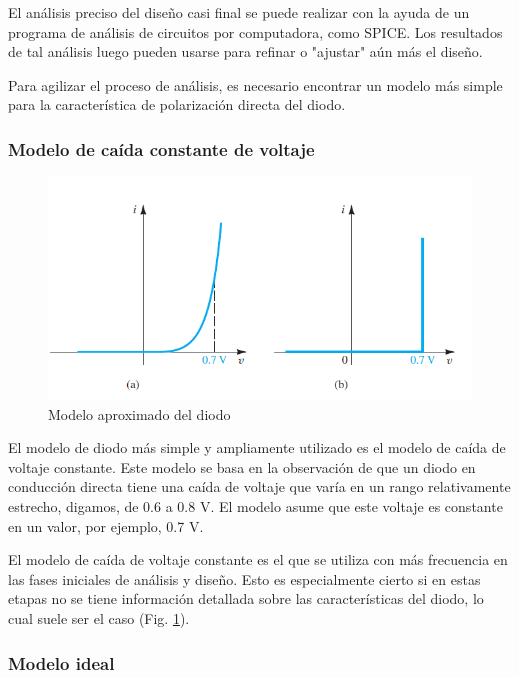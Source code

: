 El análisis preciso del diseño casi final se puede realizar con la ayuda de un programa de análisis de circuitos por computadora, como SPICE. Los resultados de tal análisis luego pueden usarse para refinar o "ajustar" aún más el diseño.

Para agilizar el proceso de análisis, es necesario encontrar un modelo más simple para la característica de polarización directa del diodo.

\subsubsection{Modelo de caída constante de voltaje}

\begin{figure}[H]
    \centering
    \includegraphics[scale=0.6]{Electronica/diodo_f7.png}
    \caption{Modelo aproximado del diodo}
    \label{fig_ModeloDiodoAproximado}
\end{figure}


El modelo de diodo más simple y ampliamente utilizado es el modelo de caída de voltaje constante. Este modelo se basa en la observación de que un diodo en conducción directa tiene una caída de voltaje que varía en un rango relativamente estrecho, digamos, de 0.6 a 0.8 V. El modelo asume que este voltaje es constante en un valor, por ejemplo, 0.7 V.

El modelo de caída de voltaje constante es el que se utiliza con más frecuencia en las fases iniciales de análisis y diseño. Esto es especialmente cierto si en estas etapas no se tiene información detallada sobre las características del diodo, lo cual suele ser el caso (Fig. \ref{fig_ModeloDiodoAproximado}).

\subsubsection{Modelo ideal}

